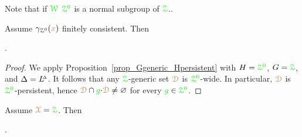 
Note that if $\grW$ $\gr\Z^0$ is a normal subgroup of $\grZ$..


  




\begin{proposition}\label{prop_Z0_inclusione1}
  Assume $\gamma_{\Z^0}({\mr x})$ finitely consistent.
  Then                            

  .
 
\end{proposition}

\begin{proof}
  We apply Proposition~\ref{prop_Ggeneric_Hpersistent} with $H=\gr\Z^0$, $G=\grZ$, and $\Delta=\LDelta$.
  It follows that any $\grZ$-generic set $\mrD$ is $\gr\Z^0$-wide.
  In particular, $\mrD$ is $\gr\Z^0$-persistent, hence $\mrD\cap{\gr g}{\cdot}\mrD\neq\varnothing$ for every ${\gr g}\in\gr\Z^0$.
\end{proof}

\begin{proposition}\label{prop_Z0_inclusione2}
  Assume $\mrX=\grZ$.
  Then                            

  .
\end{proposition}

